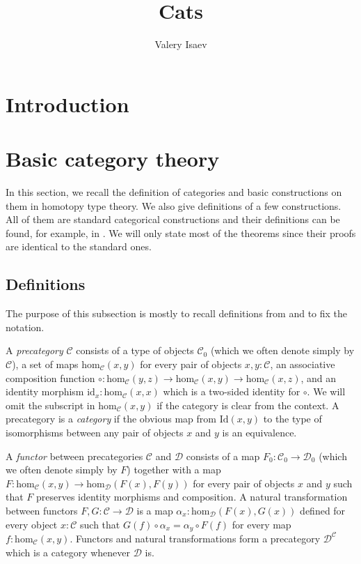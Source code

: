 \documentclass[reqno]{amsart}
\theoremstyle{definition}
\theoremstyle{remark}
\newcommand{\fs}[1]{\mathrm{#1}}
\newcommand{\scat}[1]{\mathcal{#1}}
\renewcommand{\hom}{\fs{hom}}
\newcommand{\id}{\fs{id}}
\newcommand{\Id}{\fs{Id}}
\newcommand{\ob}[1]{#1_0}
\newcommand{\fob}[1]{#1_0}
\numberwithin{figure}{section}
\begin{document}
\title{Cats}

\author{Valery Isaev}

\begin{abstract}
\end{abstract}

\maketitle

\section{Introduction}


\section{Basic category theory}

In this section, we recall the definition of categories and basic constructions on them in homotopy type theory.
We also give definitions of a few constructions.
All of them are standard categorical constructions and their definitions can be found, for example, in \cite{maclane}.
We will only state most of the theorems since their proofs are identical to the standard ones.

\subsection{Definitions}

The purpose of this subsection is mostly to recall definitions from \cite{univalent-cats} and to fix the notation.

A \emph{precategory} $\scat{C}$ consists of a type of objects $\ob{\scat{C}}$ (which we often denote simply by $\scat{C}$), a set of maps $\hom_\scat{C}(x,y)$ for every pair of objects $x,y : \scat{C}$,
an associative composition function $\circ : \hom_\scat{C}(y,z) \to \hom_\scat{C}(x,y) \to \hom_\scat{C}(x,z)$, and an identity morphism $\id_x : \hom_\scat{C}(x,x)$ which is a two-sided identity for $\circ$.
We will omit the subscript in $\hom_\scat{C}(x,y)$ if the category is clear from the context.
A precategory is a \emph{category} if the obvious map from $\Id(x,y)$ to the type of isomorphisms between any pair of objects $x$ and $y$ is an equivalence.

A \emph{functor} between precategories $\scat{C}$ and $\scat{D}$ consists of a map $\fob{F} : \ob{\scat{C}} \to \ob{\scat{D}}$ (which we often denote simply by $F$)
together with a map $F : \hom_\scat{C}(x,y) \to \hom_\scat{D}(F(x),F(y))$ for every pair of objects $x$ and $y$ such that $F$ preserves identity morphisms and composition.
A natural transformation between functors $F,G : \scat{C} \to \scat{D}$ is a map $\alpha_x : \hom_\scat{D}(F(x),G(x))$ defined for every object $x : \scat{C}$ such that $G(f) \circ \alpha_x = \alpha_y \circ F(f)$ for every map $f : \hom_\scat{C}(x,y)$.
Functors and natural transformations form a precategory $\scat{D}^\scat{C}$ which is a category whenever $\scat{D}$ is.
\end{document}
